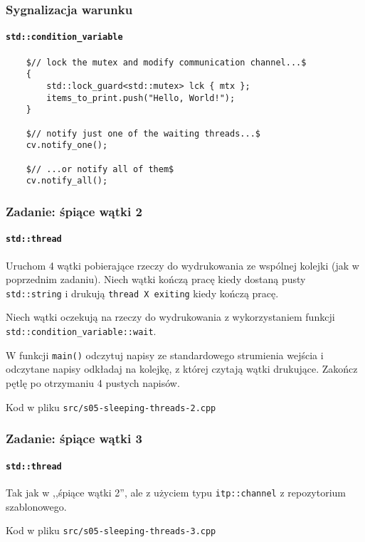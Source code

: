 \documentclass[aspectratio=169]{beamer}
\begin{document}
\begin{frame}[fragile]
    \frametitle{Sygnalizacja warunku}
    \framesubtitle{\texttt{std::condition\_variable}}

    {\small
    \begin{lstlisting}
    $// lock the mutex and modify communication channel...$
    {
        std::lock_guard<std::mutex> lck { mtx };
        items_to_print.push("Hello, World!");
    }

    $// notify just one of the waiting threads...$
    cv.notify_one();

    $// ...or notify all of them$
    cv.notify_all();
    \end{lstlisting}}
\end{frame}

\begin{frame}[fragile]
    \frametitle{Zadanie: śpiące wątki 2}
    \framesubtitle{\texttt{std::thread}}
    \label{lecture_exercise_4}

    {\small
    Uruchom 4 wątki pobierające rzeczy do wydrukowania ze wspólnej kolejki (jak
    w poprzednim zadaniu). Niech wątki kończą pracę kiedy dostaną pusty
    \texttt{std::string} i drukują \texttt{thread X exiting} kiedy kończą pracę.

    Niech wątki oczekują na rzeczy do wydrukowania z wykorzystaniem funkcji
    \texttt{std::condition\_variable::wait}.

    \vspace{1em}

    W funkcji \texttt{main()} odczytuj napisy ze standardowego strumienia
    wejścia i odczytane napisy odkładaj na kolejkę, z której czytają wątki
    drukujące.
    Zakończ pętlę po otrzymaniu 4 pustych napisów.

    \vspace{1em}

    Kod w pliku \texttt{src/s05-sleeping-threads-2.cpp}}
\end{frame}

\begin{frame}[fragile]
    \frametitle{Zadanie: śpiące wątki 3}
    \framesubtitle{\texttt{std::thread}}
    \label{lecture_exercise_5}

    Tak jak w ,,śpiące wątki 2'', ale z użyciem typu \texttt{itp::channel} z
    repozytorium szablonowego.

    \vspace{1em}

    Kod w pliku \texttt{src/s05-sleeping-threads-3.cpp}
\end{frame}
\end{document}
